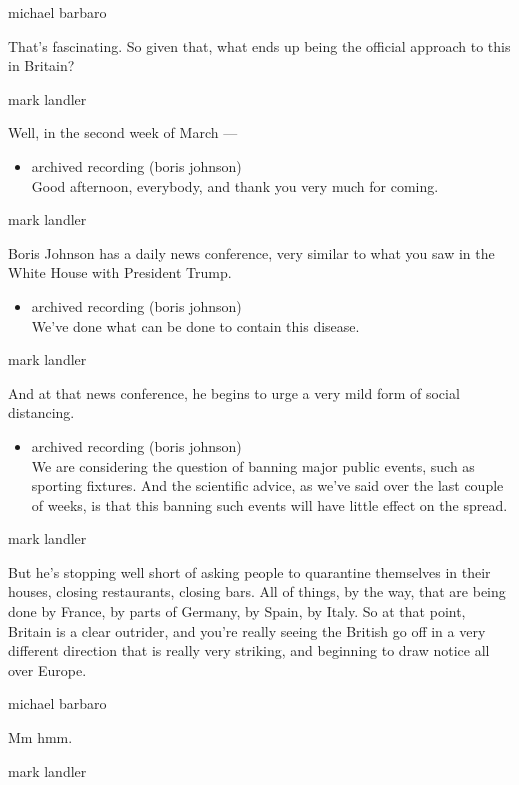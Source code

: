 michael barbaro

That's fascinating. So given that, what ends up being the official
approach to this in Britain?

mark landler

Well, in the second week of March ---

\begin{itemize}
\tightlist
\item
  archived recording (boris johnson)\\
  Good afternoon, everybody, and thank you very much for coming.
\end{itemize}

mark landler

Boris Johnson has a daily news conference, very similar to what you saw
in the White House with President Trump.

\begin{itemize}
\tightlist
\item
  archived recording (boris johnson)\\
  We've done what can be done to contain this disease.
\end{itemize}

mark landler

And at that news conference, he begins to urge a very mild form of
social distancing.

\begin{itemize}
\tightlist
\item
  archived recording (boris johnson)\\
  We are considering the question of banning major public events, such
  as sporting fixtures. And the scientific advice, as we've said over
  the last couple of weeks, is that this banning such events will have
  little effect on the spread.
\end{itemize}

mark landler

But he's stopping well short of asking people to quarantine themselves
in their houses, closing restaurants, closing bars. All of things, by
the way, that are being done by France, by parts of Germany, by Spain,
by Italy. So at that point, Britain is a clear outrider, and you're
really seeing the British go off in a very different direction that is
really very striking, and beginning to draw notice all over Europe.

michael barbaro

Mm hmm.

mark landler

